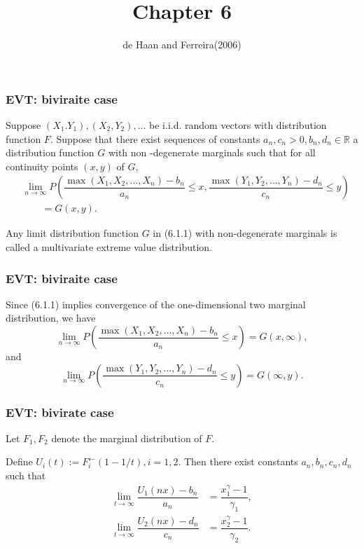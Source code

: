\documentclass{beamer}
\author{de Haan and Ferreira(2006)}
\title{Chapter 6}
\date{}
\newcommand{\suit}[1]{\left(#1\right)}
\begin{document}
\begin{frame}
\titlepage
\end{frame}

\begin{frame}
    \frametitle{EVT: biviraite case}
Suppose $(X_1.Y_1), (X_2,Y_2),\dots$ be i.i.d. random vectors with distribution function $F$. Suppose that there exist sequences of constants $a_n,c_n>0, b_n,d_n \in \mathbb{R}$ a distribution function $G$ with non -degenerate marginals such that for all continuity points $(x,y)$ of $G$,
\begin{equation}\tag{6.1.1}
    \begin{aligned}
        &\lim_{n \to \infty}P(\dfrac{\max\suit{X_1,X_2,\dots,X_n}-b_n}{a_n}\le x,\dfrac{\max\suit{Y_1,Y_2,\dots,Y_n}-d_n}{c_n}\le y)   \\
        &\quad\quad =G(x,y).
    \end{aligned}
\end{equation}

Any limit distribution function $G$ in (6.1.1) with non-degenerate marginals is called a multivariate extreme value distribution.
\end{frame}


\begin{frame}
    \frametitle{EVT: biviraite case}
Since (6.1.1) implies convergence of the one-dimensional two marginal distribution, we have 
$$
\lim_{n \to \infty}P\suit{\dfrac{\max\suit{X_1,X_2,\dots,X_n}-b_n}{a_n}\le x}=G(x,\infty) ,
$$
and 
$$
\lim_{n \to \infty}P\suit{\dfrac{\max\suit{Y_1,Y_2,\dots,Y_n}-d_n}{c_n}\le y}   =G(\infty,y).
$$

\end{frame}

\begin{frame}
    \frametitle{EVT: bivirate case}
Let $F_1,F_2$ denote the marginal distribution of $F$. 

\bigskip
Define $U_i(t):=F_i^{\leftarrow}(1-1/t), i=1,2.$ Then there exist constants $a_n,b_n,c_n,d_n$ such that
\begin{equation}
    \begin{aligned}
        \lim_{t\to \infty} \dfrac{U_1(nx)-b_n}{a_n} & =\dfrac{x^{\gamma}_1-1}{\gamma_1},      \\
        \lim_{t\to \infty} \dfrac{U_2(nx)-d_n}{c_n} & =\dfrac{x^{\gamma}_2-1}{\gamma_2}.  
    \end{aligned}
\end{equation}
\end{frame}
\end{document}
